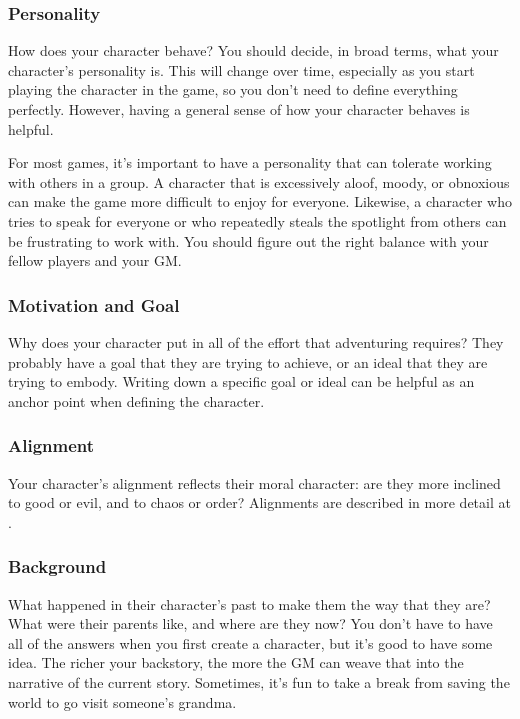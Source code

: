         \subsubsection{Personality}

            How does your character behave?
            You should decide, in broad terms, what your character's personality is.
            This will change over time, especially as you start playing the character in the game, so you don't need to define everything perfectly.
            However, having a general sense of how your character behaves is helpful.

            For most games, it's important to have a personality that can tolerate working with others in a group.
            A character that is excessively aloof, moody, or obnoxious can make the game more difficult to enjoy for everyone.
            Likewise, a character who tries to speak for everyone or who repeatedly steals the spotlight from others can be frustrating to work with.
            You should figure out the right balance with your fellow players and your GM.\@

        \subsubsection{Motivation and Goal}
            Why does your character put in all of the effort that adventuring requires?
            They probably have a goal that they are trying to achieve, or an ideal that they are trying to embody.
            Writing down a specific goal or ideal can be helpful as an anchor point when defining the character.

        \subsubsection{Alignment}
            Your character's alignment reflects their moral character: are they more inclined to good or evil, and to chaos or order?
            Alignments are described in more detail at .

        \subsubsection{Background}
            What happened in their character's past to make them the way that they are?
            What were their parents like, and where are they now?
            You don't have to have all of the answers when you first create a character, but it's good to have some idea.
            The richer your backstory, the more the GM can weave that into the narrative of the current story.
            Sometimes, it's fun to take a break from saving the world to go visit someone's grandma.

